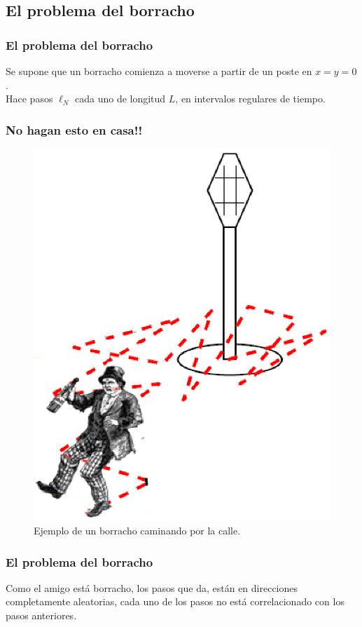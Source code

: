 \subsection{El problema del borracho}
\begin{frame}
\frametitle{El problema del borracho}
Se supone que un borracho comienza a moverse a partir de un poste en $x = y = 0$.
\\
\bigskip
Hace pasos $\ell_{N}$ cada uno de longitud $L$, en intervalos regulares de tiempo.
\end{frame}
\begin{frame}
\frametitle{No hagan esto en casa!!}
\begin{figure}
	\centering
	\includegraphics[scale=0.35]{Imagenes/Borracho_03.eps}
	\caption{Ejemplo de un borracho caminando por la calle.}
\end{figure}
\end{frame}
\begin{frame}
\frametitle{El problema del borracho}
Como el amigo está borracho, los pasos que da, están en direcciones completamente aleatorias, cada uno de los pasos no está correlacionado con los pasos anteriores.
\end{frame}
